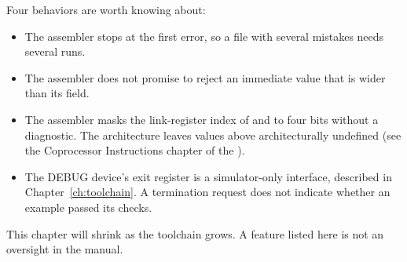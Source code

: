 Four behaviors are worth knowing about:

\begin{itemize}
	\item The assembler stops at the first error, so a file with several mistakes needs several runs.
	\item The assembler does not promise to reject an immediate value that is wider than its field.
	\item The assembler masks the link-register index of  and  to four bits without a diagnostic.
	      The architecture leaves values above  architecturally undefined (see the Coprocessor Instructions chapter of the
	      \archmanual{}).
	\item The DEBUG device's exit register is a simulator-only interface, described in Chapter~\ref{ch:toolchain}. A termination
	      request does not indicate whether an example passed its checks.
\end{itemize}

This chapter will shrink as the toolchain grows. A feature listed here is not an oversight in the manual.
